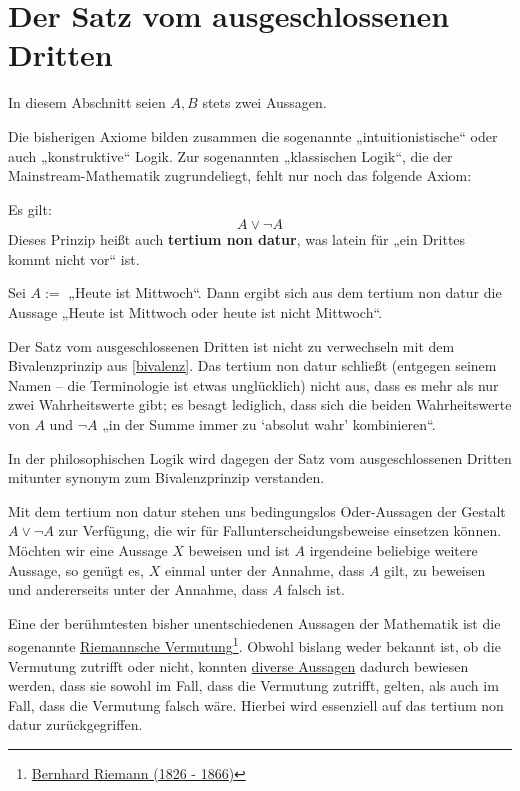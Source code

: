 \section{Der Satz vom ausgeschlossenen Dritten}


In diesem Abschnitt seien $A,B$ stets zwei Aussagen.

Die bisherigen Axiome bilden zusammen die sogenannte „intuitionistische“ oder auch „konstruktive“ Logik. Zur sogenannten „klassischen Logik“, die der Mainstream-Mathematik zugrundeliegt, fehlt nur noch das folgende Axiom:


\begin{axiom} \label{excludedmiddle}  
    Es gilt:
        \[ A\lor \neg A \]
    Dieses Prinzip heißt auch \textbf{tertium non datur}, was latein für „ein Drittes kommt nicht vor“ ist.
\end{axiom}


\begin{bsp}
    Sei $A:=$ „Heute ist Mittwoch“. Dann ergibt sich aus dem tertium non datur die Aussage „Heute ist Mittwoch oder heute ist nicht Mittwoch“.
\end{bsp}


\begin{bem}
    Der Satz vom ausgeschlossenen Dritten ist nicht zu verwechseln mit dem Bivalenzprinzip aus \cref{bivalenz}. Das tertium non datur schließt (entgegen seinem Namen -- die Terminologie ist etwas unglücklich) nicht aus, dass es mehr als nur zwei Wahrheitswerte gibt; es besagt lediglich, dass sich die beiden Wahrheitswerte von $A$ und $\neg A$ „in der Summe immer zu `absolut wahr' kombinieren“.
    
    In der philosophischen Logik wird dagegen der Satz vom ausgeschlossenen Dritten mitunter synonym zum Bivalenzprinzip verstanden.
\end{bem}


\begin{bem}
    Mit dem tertium non datur stehen uns bedingungslos Oder-Aussagen der Gestalt $A\lor \neg A$ zur Verfügung, die wir für Fallunterscheidungsbeweise einsetzen können. Möchten wir eine Aussage $X$ beweisen und ist $A$ irgendeine beliebige weitere Aussage, so genügt es, $X$ einmal unter der Annahme, dass $A$ gilt, zu beweisen und andererseits unter der Annahme, dass $A$ falsch ist.
    
    Eine der berühmtesten bisher unentschiedenen Aussagen der Mathematik ist die sogenannte \href{https://de.wikipedia.org/wiki/Riemannsche_Vermutung}{Riemannsche Vermutung}\footnote{\href{https://de.wikipedia.org/wiki/Bernhard_Riemann}{Bernhard Riemann (1826 - 1866)}}. Obwohl bislang weder bekannt ist, ob die Vermutung zutrifft oder nicht, konnten \href{https://en.wikipedia.org/wiki/Riemann_hypothesis#Excluded_middle}{diverse Aussagen} dadurch bewiesen werden, dass sie sowohl im Fall, dass die Vermutung zutrifft, gelten, als auch im Fall, dass die Vermutung falsch wäre. Hierbei wird essenziell auf das tertium non datur zurückgegriffen.
\end{bem}


